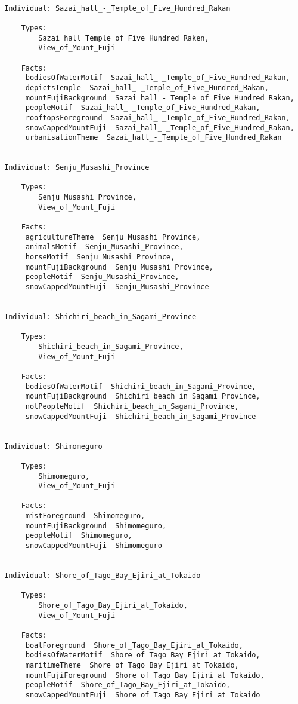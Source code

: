 \documentclass[titlepage,a4paper,12pt,oneside]{book}
\begin{document}
\begin{appendices}
\begin{lstlisting}
    
Individual: Sazai_hall_-_Temple_of_Five_Hundred_Rakan

    Types: 
        Sazai_hall_Temple_of_Five_Hundred_Raken,
        View_of_Mount_Fuji
    
    Facts:  
     bodiesOfWaterMotif  Sazai_hall_-_Temple_of_Five_Hundred_Rakan,
     depictsTemple  Sazai_hall_-_Temple_of_Five_Hundred_Rakan,
     mountFujiBackground  Sazai_hall_-_Temple_of_Five_Hundred_Rakan,
     peopleMotif  Sazai_hall_-_Temple_of_Five_Hundred_Rakan,
     rooftopsForeground  Sazai_hall_-_Temple_of_Five_Hundred_Rakan,
     snowCappedMountFuji  Sazai_hall_-_Temple_of_Five_Hundred_Rakan,
     urbanisationTheme  Sazai_hall_-_Temple_of_Five_Hundred_Rakan
    
    
Individual: Senju_Musashi_Province

    Types: 
        Senju_Musashi_Province,
        View_of_Mount_Fuji
    
    Facts:  
     agricultureTheme  Senju_Musashi_Province,
     animalsMotif  Senju_Musashi_Province,
     horseMotif  Senju_Musashi_Province,
     mountFujiBackground  Senju_Musashi_Province,
     peopleMotif  Senju_Musashi_Province,
     snowCappedMountFuji  Senju_Musashi_Province
    
    
Individual: Shichiri_beach_in_Sagami_Province

    Types: 
        Shichiri_beach_in_Sagami_Province,
        View_of_Mount_Fuji
    
    Facts:  
     bodiesOfWaterMotif  Shichiri_beach_in_Sagami_Province,
     mountFujiBackground  Shichiri_beach_in_Sagami_Province,
     notPeopleMotif  Shichiri_beach_in_Sagami_Province,
     snowCappedMountFuji  Shichiri_beach_in_Sagami_Province
    
    
Individual: Shimomeguro

    Types: 
        Shimomeguro,
        View_of_Mount_Fuji
    
    Facts:  
     mistForeground  Shimomeguro,
     mountFujiBackground  Shimomeguro,
     peopleMotif  Shimomeguro,
     snowCappedMountFuji  Shimomeguro
    
    
Individual: Shore_of_Tago_Bay_Ejiri_at_Tokaido

    Types: 
        Shore_of_Tago_Bay_Ejiri_at_Tokaido,
        View_of_Mount_Fuji
    
    Facts:  
     boatForeground  Shore_of_Tago_Bay_Ejiri_at_Tokaido,
     bodiesOfWaterMotif  Shore_of_Tago_Bay_Ejiri_at_Tokaido,
     maritimeTheme  Shore_of_Tago_Bay_Ejiri_at_Tokaido,
     mountFujiForeground  Shore_of_Tago_Bay_Ejiri_at_Tokaido,
     peopleMotif  Shore_of_Tago_Bay_Ejiri_at_Tokaido,
     snowCappedMountFuji  Shore_of_Tago_Bay_Ejiri_at_Tokaido
    

\end{lstlisting}
\end{appendices}
\end{document}
